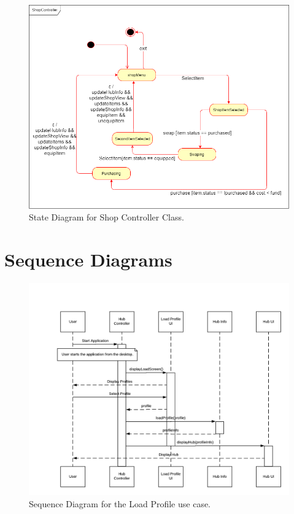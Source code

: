 \documentclass[]{article}
\begin{document}
\begin{figure}[H]
    \centering
    \includegraphics[width=\textwidth]{ShopController.png}
    \caption{State Diagram for Shop Controller Class.}
    \label{fig:ca}
\end{figure}

\section{Sequence Diagrams}
\label{sec:sequence_diagrams}
\begin{figure}[H]
    \centering
    \includegraphics[width=\textwidth]{SD/LoadProfileSD.png}
    \caption{Sequence Diagram for the Load Profile use case.}
    \label{fig:sd}
\end{figure}
\end{document}
